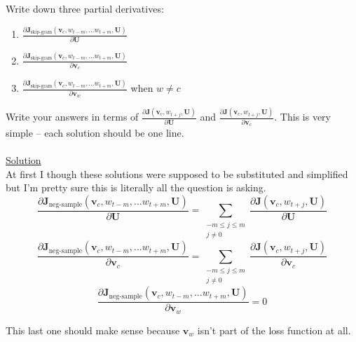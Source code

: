 \documentclass[12pt]{article}
\begin{document}
Write down three partial derivatives: 
\begin{enumerate}[label=(\roman*)]
    \item ${\frac{\partial \bm J_{\textrm{skip-gram}}(\bm v_c, w_{t-m},\ldots w_{t+m}, \bm U)} {\partial \bm U}}$
    \item ${\frac{\partial \bm J_{\textrm{skip-gram}}(\bm v_c, w_{t-m},\ldots w_{t+m}, \bm U)} {\partial \bm v_c}}$
    \item ${\frac{\partial \bm J_{\textrm{skip-gram}}(\bm v_c, w_{t-m},\ldots w_{t+m}, \bm U)} {\partial \bm v_w}}$ 
    when $w \ne c$
\end{enumerate}
Write your answers in terms of ${\frac{\partial \bm J(\bm v_c, w_{t+j}, \bm U)}{\partial \bm U}}$ 
and ${\frac{\partial \bm J(\bm v_c, w_{t+j}, \bm U)}{\partial \bm v_c}}$. This is very simple -- 
each solution should be one line.
~\\
~\\
\underline{Solution}
~\\
At first I though these solutions were supposed to be substituted and simplified but I'm pretty sure this 
is literally all the question is asking. 
\begin{equation}
    \frac{\partial \bm J_{\textrm{neg-sample}}(\bm v_c, w_{t-m},\ldots w_{t+m}, \bm U)}{\partial \bm U} = 
    \sum_{\substack{-m\le j \le m \\ j\ne 0}} 
    \frac{\partial \bm J(\bm v_c, w_{t+j}, \bm U)}{\partial \bm U}
\end{equation}
\begin{equation}
    \frac{\partial \bm J_{\textrm{neg-sample}}(\bm v_c, w_{t-m},\ldots w_{t+m}, \bm U)}{\partial \bm v_c} = 
    \sum_{\substack{-m\le j \le m \\ j\ne 0}} 
    \frac{\partial \bm J(\bm v_c, w_{t+j}, \bm U)}{\partial \bm v_c}
\end{equation}
\begin{equation}
    \frac{\partial \bm J_{\textrm{neg-sample}}(\bm v_c, w_{t-m},\ldots w_{t+m}, \bm U)}{\partial \bm v_w} = 0
\end{equation}

This last one should make sense because $\bm v_w$ isn't part of the loss function at all. 
\end{document}
